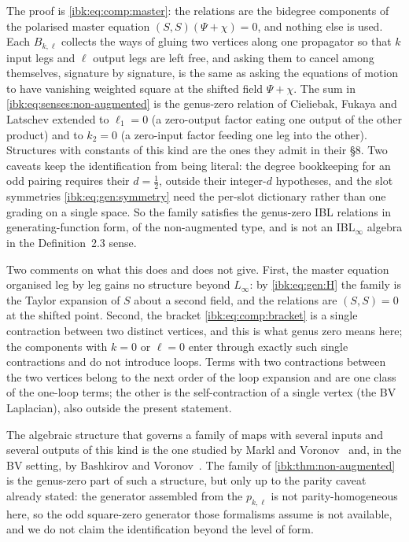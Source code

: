 The proof is \eqref{ibk:eq:comp:master}: the relations are the bidegree components of the polarised master equation $(S,S)(\Psi+\chi)=0$, and nothing else is used. Each $B_{k,\ell}$ collects the ways of gluing two vertices along one propagator so that $k$ input legs and $\ell$ output legs are left free, and asking them to cancel among themselves, signature by signature, is the same as asking the equations of motion to have vanishing weighted square at the shifted field $\Psi+\chi$. The sum in \eqref{ibk:eq:senses:non-augmented} is the genus-zero relation of Cieliebak, Fukaya and Latschev extended to $\ell_1=0$ (a zero-output factor eating one output of the other product) and to $k_2=0$ (a zero-input factor feeding one leg into the other). Structures with constants of this kind are the ones they admit in their \S8. Two caveats keep the identification from being literal: the degree bookkeeping for an odd pairing requires their $d=\frac12$, outside their integer-$d$ hypotheses, and the slot symmetries \eqref{ibk:eq:gen:symmetry} need the per-slot dictionary rather than one grading on a single space. So the family satisfies the genus-zero IBL relations in generating-function form, of the non-augmented type, and is not an IBL$_\infty$ algebra in the Definition~2.3 sense.

Two comments on what this does and does not give. First, the master equation organised leg by leg gains no structure beyond $L_\infty$: by \eqref{ibk:eq:gen:H} the family is the Taylor expansion of $S$ about a second field, and the relations are $(S,S)=0$ at the shifted point. Second, the bracket \eqref{ibk:eq:comp:bracket} is a single contraction between two distinct vertices, and this is what genus zero means here; the components with $k=0$ or $\ell=0$ enter through exactly such single contractions and do not introduce loops. Terms with two contractions between the two vertices belong to the next order of the loop expansion and are one class of the one-loop terms; the other is the self-contraction of a single vertex (the BV Laplacian), also outside the present statement.

The algebraic structure that governs a family of maps with several inputs and several outputs of this kind is the one studied by Markl and Voronov~\cite{Markl:2015:MVFormalism} and, in the BV setting, by Bashkirov and Voronov~\cite{Bashkirov:2017:BVFormalismLinftyAlgebras}. The family of \cref{ibk:thm:non-augmented} is the genus-zero part of such a structure, but only up to the parity caveat already stated: the generator assembled from the $p_{k,\ell}$ is not parity-homogeneous here, so the odd square-zero generator those formalisms assume is not available, and we do not claim the identification beyond the level of form.

